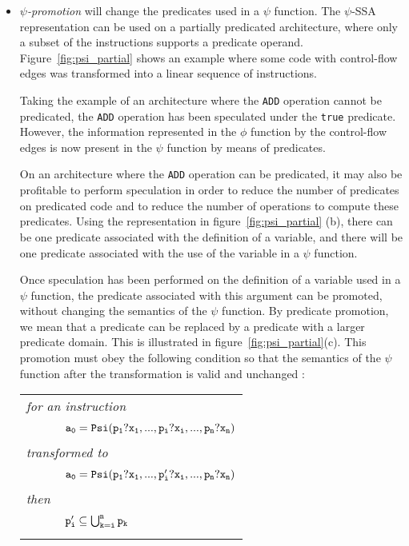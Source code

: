 \begin{itemize}

\item{\emph{$\psi$-promotion}} will change the predicates used in a
  $\psi$ function. The $\psi$-SSA representation can be used on a
  partially predicated architecture, where only a subset of the
  instructions supports a predicate operand.
  Figure~\ref{fig:psi_partial} shows an example where some code with
  control-flow edges was transformed into a linear sequence of
  instructions.

Taking the example of an architecture where the {\tt ADD} operation
cannot be predicated, the {\tt ADD} operation has been speculated
under the {\tt true} predicate. However, the information represented
in the $\phi$ function by the control-flow edges is now present in the
$\psi$ function by means of predicates.

On an architecture where the {\tt ADD} operation can be predicated, it
may also be profitable to perform speculation in order to reduce the
number of predicates on predicated code and to reduce the number of
operations to compute these predicates. Using the representation in
figure~\ref{fig:psi_partial} (b), there can be one predicate associated
with the definition of a variable, and there will be one predicate
associated with the use of the variable in a $\psi$ function.

Once speculation has been performed on the definition of a variable
used in a $\psi$ function, the predicate associated with this argument
can be promoted, without changing the semantics of the $\psi$
function. By predicate promotion, we mean that a predicate can be
replaced by a predicate with a larger predicate domain. This is
illustrated in figure~\ref{fig:psi_partial}(c). This promotion must
obey the following condition so that the semantics of the $\psi$
function after the transformation is valid and unchanged :

\begin{tabular}{ll}
\multicolumn{2}{l}{\it for an instruction} \\
\ \ \ \ & {$ {\tt a_0 = Psi(p_1?x_1, ..., p_i?x_i, ..., p_n?x_n)}$} \\
\multicolumn{2}{l}{\it transformed to} \\
\ \ \ \ & {$ {\tt a_0 = Psi(p_1?x_1, ..., p_i'?x_i, ..., p_n?x_n)}$} \\
\multicolumn{2}{l}{\it then} \\
\ \ \ \ & {${\tt p_i' \subseteq \bigcup_{k=i}^n p_k}$} \\
\\
\end{tabular}


\end{itemize}
